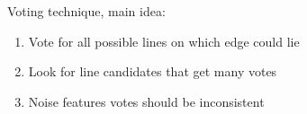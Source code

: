  Voting technique, main idea:
\begin{enumerate}
    \item Vote for all possible lines on which edge could lie
    \item Look for line candidates that get many votes
    \item Noise features votes should be inconsistent
\end{enumerate}
